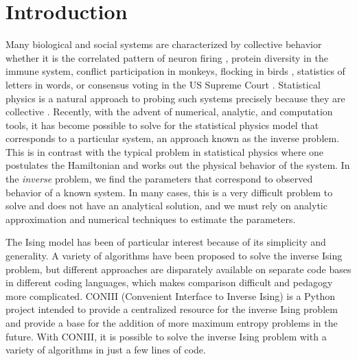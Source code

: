 \documentclass[aps,prl,twocolumn,nofootinbib]{revtex4-1}
\begin{document}
\section{Introduction}
Many biological and social systems are characterized by collective behavior whether it is the correlated pattern of neuron firing \cite{Schneidman:2006he}, protein diversity in the immune system, conflict participation in monkeys, flocking in birds \cite{Bialek:2012cs}, statistics of letters in words, or consensus voting in the US Supreme Court \cite{Lee:2015ev}. Statistical physics is a natural approach to probing such systems precisely because they are collective \cite{Castellano:2009ce}.
Recently, with the advent of numerical, analytic, and computation tools, it has become possible to solve for the statistical physics model that corresponds to a particular system, an approach known as the inverse problem.
This is in contrast with the typical problem in statistical physics where one postulates the Hamiltonian and works out the physical behavior of the system. In the \textit{inverse} problem, we  find the parameters that correspond to observed behavior of a known system. In many cases, this is a very difficult problem to solve and does not have an analytical solution, and we must rely on analytic approximation and numerical techniques to estimate the parameters.

The Ising model has been of particular interest because of its simplicity and generality. A variety of algorithms have been proposed to solve the inverse Ising problem, but different approaches are disparately available on separate code bases in different coding languages, which makes comparison difficult and pedagogy more complicated.
CONIII (Convenient Interface to Inverse Ising) is a Python project intended to provide a centralized resource for the inverse Ising problem and provide a base for the addition of more maximum entropy problems in the future. With CONIII, it is possible to solve the inverse Ising problem with a variety of algorithms in just a few lines of code.
\end{document}
